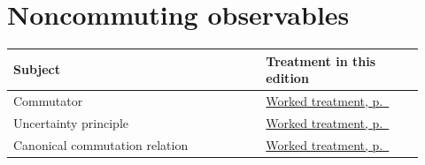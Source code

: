 \documentclass[11pt,oneside]{book}
\begin{document}
\section*{Noncommuting observables}
\begin{longtable}{p{0.57\linewidth}p{0.35\linewidth}}
\toprule Subject & Treatment in this edition \\
\midrule\endhead
{}\label{index:commutator}Commutator & \hyperref[topic:commutator]{Worked treatment, p.~\pageref*{topic:commutator}} \\
\label{index:uncertainty-principle}Uncertainty principle & \hyperref[topic:uncertainty-principle]{Worked treatment, p.~\pageref*{topic:uncertainty-principle}} \\
\label{index:canonical-commutation-relation}Canonical commutation relation & \hyperref[topic:canonical-commutation-relation]{Worked treatment, p.~\pageref*{topic:canonical-commutation-relation}} \\
\bottomrule
\end{longtable}
\end{document}
